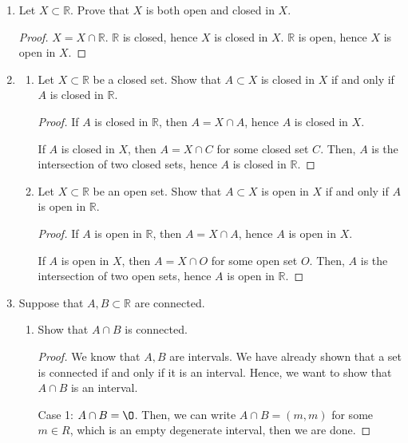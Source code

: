 \documentclass[11pt]{article}
\newcommand{\bbR}{\mathbb{R}}
\renewcommand{\emptyset}{\O}
\theoremstyle{definition}
\numberwithin{equation}{section}
\begin{document}
\begin{enumerate}

\item Let $X\subset \bbR.$ Prove that $X$ is both open and closed in $X.$

\begin{proof}
$X = X \cap \bbR$. $\bbR$ is closed, hence $X$ is closed in $X$. $\bbR$ is open, hence $X$ is open in $X$. 


\renewcommand\qedsymbol{QED}
\end{proof}

\item 
\begin{enumerate}
\item Let $X\subset \bbR$ be a closed set. Show that $A\subset X$ is closed in $X$ if and only if $A$ is closed in $\bbR.$ 
\begin{proof}
If $A$ is closed in $\bbR$, then $A = X \cap A$, hence $A$ is closed in $X$. 

If $A$ is closed in $X$, then $A = X \cap C$ for some closed set $C$. Then, $A$ is the intersection of two closed sets, hence $A$ is closed in $\bbR$. 


\renewcommand\qedsymbol{QED}
\end{proof}
\item Let $X\subset \bbR$ be an open set. Show that $A\subset X$ is open in $X$ if and only if $A$ is open in $\bbR.$
\begin{proof}
If $A$ is open in $\bbR$, then $A = X \cap A$, hence $A$ is open in $X$. 

If $A$ is open in $X$, then $A = X \cap O$ for some open set $O$. Then, $A$ is the intersection of two open sets, hence $A$ is open in $\bbR$. 


\renewcommand\qedsymbol{QED}
\end{proof}

\end{enumerate}

\item
Suppose that $A, B\subset \bbR$ are connected.
\begin{enumerate}
	\item Show that $A\cap B$ is connected.
\begin{proof}
We know that $A,B$ are intervals. We have already shown that a set is connected if and only if it is an interval. Hence, we want to show that $A \cap B$ is an interval.

Case 1: $A \cap B = \emptyset$. Then, we can write $A \cap B =(m,m)$ for some $m \in R$, which is an empty degenerate interval, then we are done.


\end{proof}
\end{enumerate}
\end{enumerate}
\end{document}
